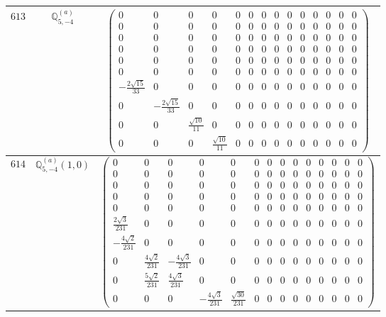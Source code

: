 \documentclass[fleqn,8pt,landscape]{jsarticle}
\begin{document}
\begin{center}
\begin{longtable}{ccc}
$ 613 $ & $ \mathbb{Q}_{5,-4}^{(a)} $ & $ \begin{pmatrix} 0 & 0 & 0 & 0 & 0 & 0 & 0 & 0 & 0 & 0 & 0 & 0 & 0 & 0 \\ 0 & 0 & 0 & 0 & 0 & 0 & 0 & 0 & 0 & 0 & 0 & 0 & 0 & 0 \\ 0 & 0 & 0 & 0 & 0 & 0 & 0 & 0 & 0 & 0 & 0 & 0 & 0 & 0 \\ 0 & 0 & 0 & 0 & 0 & 0 & 0 & 0 & 0 & 0 & 0 & 0 & 0 & 0 \\ 0 & 0 & 0 & 0 & 0 & 0 & 0 & 0 & 0 & 0 & 0 & 0 & 0 & 0 \\ 0 & 0 & 0 & 0 & 0 & 0 & 0 & 0 & 0 & 0 & 0 & 0 & 0 & 0 \\ - \frac{2 \sqrt{15}}{33} & 0 & 0 & 0 & 0 & 0 & 0 & 0 & 0 & 0 & 0 & 0 & 0 & 0 \\ 0 & - \frac{2 \sqrt{15}}{33} & 0 & 0 & 0 & 0 & 0 & 0 & 0 & 0 & 0 & 0 & 0 & 0 \\ 0 & 0 & \frac{\sqrt{10}}{11} & 0 & 0 & 0 & 0 & 0 & 0 & 0 & 0 & 0 & 0 & 0 \\ 0 & 0 & 0 & \frac{\sqrt{10}}{11} & 0 & 0 & 0 & 0 & 0 & 0 & 0 & 0 & 0 & 0 \end{pmatrix} $ \\ \hline
$ 614 $ & $ \mathbb{Q}_{5,-4}^{(a)}(1,0) $ & $ \begin{pmatrix} 0 & 0 & 0 & 0 & 0 & 0 & 0 & 0 & 0 & 0 & 0 & 0 & 0 & 0 \\ 0 & 0 & 0 & 0 & 0 & 0 & 0 & 0 & 0 & 0 & 0 & 0 & 0 & 0 \\ 0 & 0 & 0 & 0 & 0 & 0 & 0 & 0 & 0 & 0 & 0 & 0 & 0 & 0 \\ 0 & 0 & 0 & 0 & 0 & 0 & 0 & 0 & 0 & 0 & 0 & 0 & 0 & 0 \\ 0 & 0 & 0 & 0 & 0 & 0 & 0 & 0 & 0 & 0 & 0 & 0 & 0 & 0 \\ \frac{2 \sqrt{3}}{231} & 0 & 0 & 0 & 0 & 0 & 0 & 0 & 0 & 0 & 0 & 0 & 0 & 0 \\ - \frac{4 \sqrt{2}}{231} & 0 & 0 & 0 & 0 & 0 & 0 & 0 & 0 & 0 & 0 & 0 & 0 & 0 \\ 0 & \frac{4 \sqrt{2}}{231} & - \frac{4 \sqrt{3}}{231} & 0 & 0 & 0 & 0 & 0 & 0 & 0 & 0 & 0 & 0 & 0 \\ 0 & \frac{5 \sqrt{2}}{231} & \frac{4 \sqrt{3}}{231} & 0 & 0 & 0 & 0 & 0 & 0 & 0 & 0 & 0 & 0 & 0 \\ 0 & 0 & 0 & - \frac{4 \sqrt{3}}{231} & \frac{\sqrt{30}}{231} & 0 & 0 & 0 & 0 & 0 & 0 & 0 & 0 & 0 \end{pmatrix} $ \\ \hline

\end{longtable}
\end{center}
\end{document}
